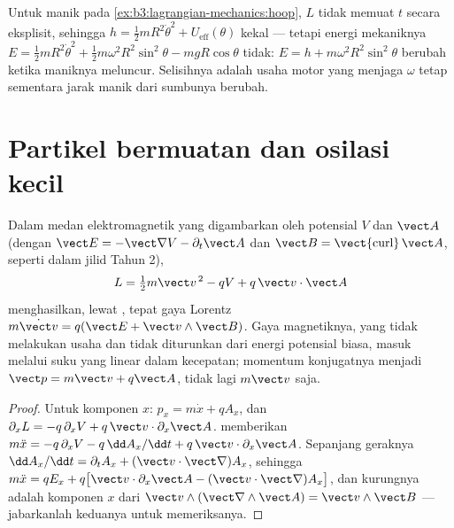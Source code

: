 \begin{example}\label{ex:b3:lagrangian-mechanics:hoop-energy}
Untuk manik pada \cref{ex:b3:lagrangian-mechanics:hoop}, $L$ tidak
memuat $t$ secara eksplisit, sehingga $h = \tfrac12 mR^2\dot\theta^2 + U_{\text{eff}}
(\theta)$ kekal --- tetapi energi mekaniknya $E = \tfrac12
mR^2\dot\theta^2 + \tfrac12 m\omega^2R^2\sin^2\theta - mgR\cos\theta$
tidak: $E = h + m\omega^2R^2\sin^2\theta$ berubah ketika maniknya
meluncur. Selisihnya adalah usaha motor yang menjaga $\omega$ tetap
sementara jarak manik dari sumbunya berubah.
\end{example}

\section{Partikel bermuatan dan osilasi kecil}

\begin{proposition}\label{prop:b3:lagrangian-mechanics:charge}
Dalam medan elektromagnetik yang digambarkan oleh potensial $V$ dan
$\vect A$ (dengan $\vect E = -\vect\nabla V - \partial_t\vect A$ dan
$\vect B = \operatorname{\vect{curl}}\vect A$, seperti dalam jilid Tahun
2), 
\[
L = \tfrac12 m\vect v^{\,2} - qV + q\,\vect v\cdot\vect A
\]
menghasilkan, lewat , tepat gaya Lorentz
$m\dot{\vect v} = q(\vect E + \vect v\wedge\vect B)$. Gaya magnetiknya,
yang tidak melakukan usaha dan tidak diturunkan dari energi potensial
biasa, masuk melalui suku yang linear dalam kecepatan; momentum
konjugatnya menjadi $\vect p = m\vect v + q\vect A$, tidak lagi
$m\vect v$ saja.
\end{proposition}

\begin{proof}
Untuk komponen $x$: $p_x = m\dot x + qA_x$, dan
$\partial_xL = -q\,\partial_xV + q\,\vect v\cdot\partial_x\vect A$.
 memberikan $m\ddot x = -q\,\partial_xV -
q\,\dd A_x/\dd t + q\,\vect v\cdot\partial_x\vect A$. Sepanjang geraknya
$\dd A_x/\dd t = \partial_tA_x + (\vect v\cdot\vect\nabla)A_x$, sehingga
$m\ddot x = qE_x + q\big[\vect v\cdot\partial_x\vect A - (\vect v\cdot
\vect\nabla)A_x\big]$, dan kurungnya adalah komponen $x$ dari $\vect
v\wedge(\vect\nabla\wedge\vect A) = \vect v\wedge\vect B$ --- jabarkanlah
keduanya untuk memeriksanya.
\end{proof}


